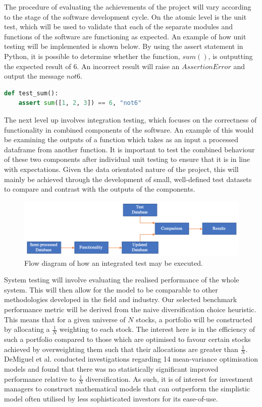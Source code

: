 \documentclass[10pt,onecolumn,letterpaper]{article}
\begin{document}
The procedure of evaluating the achievements of the project will vary according to the stage of the software development cycle. On the atomic level is the unit test, which will be used to validate that each of the separate modules and functions of the software are functioning as expected. An example\cite{python_testing} of how unit testing will be implemented is shown below. By using the assert statement in Python, it is possible to determine whether the function, $sum()$, is outputting the expected result of $6$. An incorrect result will raise an $AssertionError$ and output the message $not6$.

\begin{lstlisting}[language=Python]
def test_sum():
    assert sum([1, 2, 3]) == 6, "not6"
\end{lstlisting} 

The next level up involves integration testing, which focuses on the correctness of functionality in combined components of the software. An example of this would be examining the outputs of a function which takes as an input a processed dataframe from another function. It is important to test the combined behaviour of these two components after individual unit testing to ensure that it is in line with expectations. Given the data orientated nature of the project, this will mainly be achieved through the development of small, well-defined test datasets to compare and contrast with the outputs of the components.  

\begin{figure}[!hbt!]
\centering
\includegraphics[width=15.5cm]{integrated_testing.png}
\caption{Flow diagram of how an integrated test may be executed.}
\end{figure}

System testing will involve evaluating the realised performance of the whole system. This will then allow for the model to be comparable to other methodologies developed in the field and industry. Our selected benchmark performance metric will be derived from the naive diversification choice heuristic. This means that for a given universe of $N$ stocks, a portfolio will be constructed by allocating a $\frac{1}{N}$ weighting to each stock. The interest here is in the efficiency of such a portfolio compared to those which are optimised to favour certain stocks achieved by overweighting them such that their allocations are greater than $\frac{1}{N}$. DeMiguel et al. conducted investigations\cite{DeMiguel} regarding 14 mean-variance optimisation models and found that there was no statistically significant improved performance relative to $\frac{1}{N}$ diversification. As such, it is of interest for investment managers to construct mathematical models that can outperform the simplistic model often utilised by less sophisticated investors for its ease-of-use. 
\end{document}
